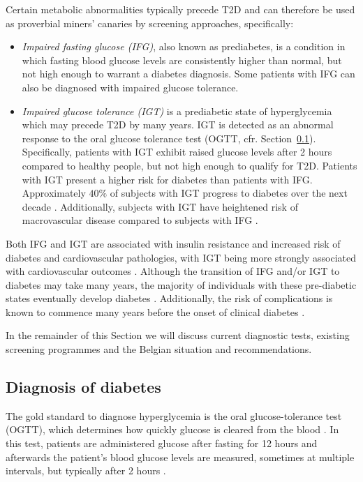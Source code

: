 Certain metabolic abnormalities typically precede T2D and can therefore be used as proverbial miners' canaries by screening approaches, specifically:
\begin{itemize}
\item \emph{Impaired fasting glucose (IFG)}, also known as prediabetes, is a condition in which fasting blood glucose levels are consistently higher than normal, but not high enough to warrant a diabetes diagnosis. Some patients with IFG can also be diagnosed with impaired glucose tolerance.
\item \emph{Impaired glucose tolerance (IGT)} is a prediabetic state of hyperglycemia which may precede T2D by many years. IGT is detected as an abnormal response to the oral glucose tolerance test (OGTT, cfr. Section~\ref{diagnosis-diabetes}). Specifically, patients with IGT exhibit raised glucose levels after 2 hours compared to healthy people, but not high enough to qualify for T2D. Patients with IGT present a higher risk for diabetes than patients with IFG. Approximately $40\%$ of subjects with IGT progress to diabetes over the next decade \citep{zimmet2001global}. Additionally, subjects with IGT have heightened risk of macrovascular disease compared to subjects with IFG \citep{tominaga1999impaired, unwin2002impaired}.
\end{itemize}
Both IFG and IGT are associated with insulin resistance and increased risk of diabetes and cardiovascular pathologies, with IGT being more strongly associated with cardiovascular outcomes \citep{unwin2002impaired}. Although the transition of IFG and/or IGT to diabetes may take many years, the majority of individuals with these pre-diabetic states eventually develop diabetes \cite{tuomilehto2001prevention,diabetes2002reduction,nathan2007impaired}. Additionally, the risk of complications is known to commence many years before the onset of clinical diabetes \cite{haffner1990cardiovascular,zimmet2001global}.

In the remainder of this Section we will discuss current diagnostic tests, existing screening programmes and the Belgian situation and recommendations.


\subsection{Diagnosis of diabetes} \label{diagnosis-diabetes}
The gold standard to diagnose hyperglycemia is the oral glucose-tolerance test (OGTT), which determines how quickly glucose is cleared from the blood \citep{alberti1998definition, world2006definition}. In this test, patients are administered glucose after fasting for 12 hours and afterwards the patient's blood glucose levels are measured, sometimes at multiple intervals, but typically after 2 hours \citep{diabetesliga}.

